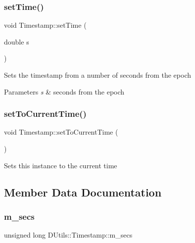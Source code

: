 \subsubsection{\texorpdfstring{set\+Time()}{setTime()}\hspace{0.1cm}{\footnotesize\ttfamily [3/3]}}
{\footnotesize\ttfamily void Timestamp\+::set\+Time (\begin{DoxyParamCaption}\item[{double}]{s }\end{DoxyParamCaption})}

Sets the timestamp from a number of seconds from the epoch 
\begin{DoxyParams}{Parameters}
{\em s} & seconds from the epoch \\
\hline
\end{DoxyParams}
\mbox{\label{class_d_utils_1_1_timestamp_ae27c920f3833c104096213c6fb17f4d8}} 
\subsubsection{\texorpdfstring{set\+To\+Current\+Time()}{setToCurrentTime()}}
{\footnotesize\ttfamily void Timestamp\+::set\+To\+Current\+Time (\begin{DoxyParamCaption}{ }\end{DoxyParamCaption})}

Sets this instance to the current time 

\subsection{Member Data Documentation}
\mbox{\label{class_d_utils_1_1_timestamp_a88b8dff916bb011ef4142ca5cc655425}} 
\subsubsection{\texorpdfstring{m\+\_\+secs}{m\_secs}}
{\footnotesize\ttfamily unsigned long D\+Utils\+::\+Timestamp\+::m\+\_\+secs\hspace{0.3cm}{\ttfamily [protected]}}



